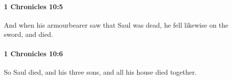 		\paragraph{1 Chronicles 10:5} %
			\label{1CHRONICLES-10-5}

			And when his armourbearer saw that Saul was dead, he fell likewise on the sword, and died.


		\paragraph{1 Chronicles 10:6} %
			\label{1CHRONICLES-10-6}

			So Saul died, and his three sons, and all his house died together.



